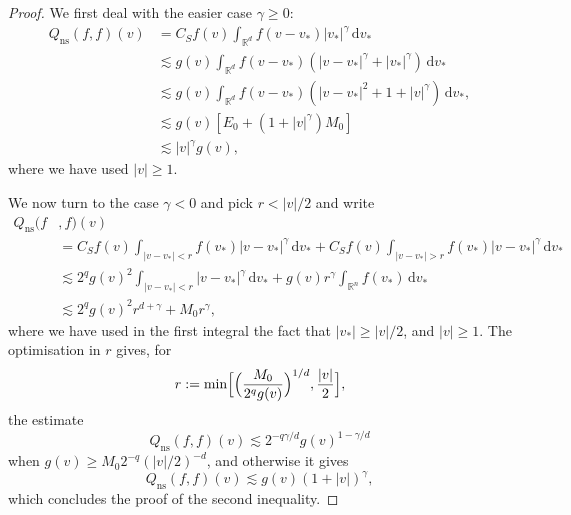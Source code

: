 \documentclass[JEP,XML,SOM,Unicode,NoFloatCountersInSection]{cedram}
\newcommand{\ns}{\mathrm{ns}}
\theoremstyle{plain}
\theoremstyle{definition}
\numberwithin{equation}{section}
\newcommand{\R}{\mathbb R}
\newcommand{\dd} {\, \mathrm{d}}
\begin{document}
\begin{proof}
We first deal with the easier case $\gamma \ge 0$:
\begin{align*}
Q_{\ns}(f,f)(v) & = C_S f(v) \int_{\R^d} f(v-v_*) |v_*|^\gamma \dd v_* \\
& \lesssim g(v) \int_{\R^d} f(v-v_*) \left(|v-v_*|^\gamma+ |v_*|^{\gamma}\right) \dd v_* \\
& \lesssim g(v) \int_{\R^d} f(v-v_*) \left(|v-v_*|^2+1 + |v|^{\gamma}\right) \dd v_*, \\
& \lesssim g(v) \left[ E_0 + \left(1+|v|^\gamma\right) M_0 \right] \\
& \lesssim |v|^\gamma g(v),
\end{align*}
where we have used $|v| \ge 1$.

We now turn to the case $\gamma <0$ and pick $r < |v|/2$ and write
\begin{align*}
Q_{\ns}(f&,f)(v) \\
& = C_S f(v) \int_{|v-v_*|< r} f(v_*) |v-v_*|^\gamma
\dd v_* + C_S f(v) \int_{|v-v_*| > r} f(v_*) |v-v_*|^\gamma \dd v_* \\
& \lesssim 2^ q g(v)^2 \int_{|v-v_*|< r} |v-v_*|^\gamma \dd v_*
+ g(v) r^{\gamma} \int_{\R^n} f(v_*) \dd v_* \\
& \lesssim 2^q g(v)^2 r^{d+\gamma} + M_0 r^{\gamma},
\end{align*}
where we have used in the first integral the fact that $|v_*| \ge
|v|/2$, and $|v| \ge 1$. The optimisation in $r$ gives, for
\[
r := \min \Bigl[ \Bigl(\frac{M_0}{2^q g(v)}\Bigl)^{1/d},
\frac{|v|}{2} \Bigl],
\]
the estimate
\begin{equation*}
Q_{\ns}(f,f)(v) \lesssim 2^{-q\gamma/d} g(v)^{1-\gamma/d}
\end{equation*}
when $g(v) \ge M_0 2^{-q} (|v|/2)^{-d}$, and otherwise it gives
\begin{equation*}
Q_{\ns}(f,f)(v) \lesssim g(v) (1+|v|)^\gamma,
\end{equation*}
which concludes the proof of the second inequality.


\end{proof}
\end{document}
